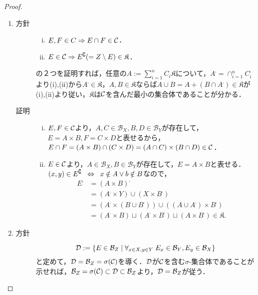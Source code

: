 \documentclass[uplatex, dvipdfmx]{jsreport}
\renewcommand{\B}{\mathcal{B}}
\begin{document}
\begin{proof}\mbox{}
    \begin{enumerate}
        \item \begin{description}
            \item[方針] \begin{enumerate}[(i)]
                \item $E,F\in C\Rightarrow E\cap F\in\mathcal{C}$．
                \item $E\in\mathcal{C}\Rightarrow E^\complement(=Z\setminus E)\in\mathfrak{K}$．
            \end{enumerate}
            の２つを証明すれば，任意の$A:=\sum_{i=1}^nC_i\mathfrak{K}$について，$A^\comp=\cap_{i=1}^nC_i^\comp$より(i),(ii)から$A^\comp\in\mathfrak{K}$，$A,B\in\mathfrak{K}$ならば$A\cup B=A+(B\cap A^\comp)\in\mathfrak{K}$が(i),(ii)より従い，$\mathfrak{K}$は$\mathcal{C}$を含んだ最小の集合体であることが分かる．
            \item[証明] \begin{enumerate}[(i)]
                \item $E,F\in\mathcal{C}$より，$A,C\in\B_X,B,D\in\B_Y$が存在して，$E=A\times B,F=C\times D$と表せるから，$E\cap F=(A\times B)\cap(C\times D)=(A\cap C)\times(B\cap D)\in\mathcal{C}$．
                \item $E\in\mathcal{C}$より，$A\in\B_X,B\in\B_Y$が存在して，$E=A\times B$と表せる．$(x,y)\in E^\complement\;\;\Leftrightarrow\;\; x\notin A\lor b\notin B$なので，
                \begin{align*}
                    E^\comp&=(A\times B)^\comp\\
                    &=(A^\comp\times Y)\cup(X\times B^\comp)\\
                    &=(A^\comp\times(B\cup B^\comp))\cup((A\cup A^\comp)\times B^\comp)\\
                    &=(A^\comp\times B)\sqcup(A^\comp\times B^\comp)\sqcup(A\times B^\comp)\in\mathfrak{K}.
                \end{align*}
            \end{enumerate}
        \end{description}
        \item 
        \begin{description}
            \item[方針] \[\D:=\Brace{E\in\B_Z\;\middle|\;\forall_{x\in X,y\in Y}\;E_x\in\B_Y,E_y\in\B_X}\]
            と定めて，$\D=\B_Z=\sigma(\cC)$を導く．$\mathcal{D}$が$\mathcal{C}$を含む$\sigma$-集合体であることが示せれば，$\B_Z=\sigma(\cC)\subset\D\subset\B_Z$より，$\D=\B_Z$が従う．

\end{description}
\end{enumerate}
\end{proof}
\end{document}
